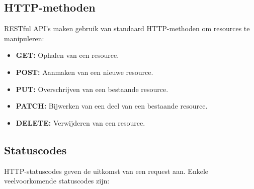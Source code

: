 \subsection{HTTP-methoden}

RESTful API's maken gebruik van standaard HTTP-methoden om resources te manipuleren\textcite{MozillaFoundation}:

\begin{itemize}
  \item \textbf{GET:} Ophalen van een resource.
  \item \textbf{POST:} Aanmaken van een nieuwe resource.
  \item \textbf{PUT:} Overschrijven van een bestaande resource.
  \item \textbf{PATCH:} Bijwerken van een deel van een bestaande resource.
  \item \textbf{DELETE:} Verwijderen van een resource.
\end{itemize}

\subsection{Statuscodes}

HTTP-statuscodes geven de uitkomst van een request aan\textcite{MozillaFoundation}. Enkele veelvoorkomende statuscodes zijn:

